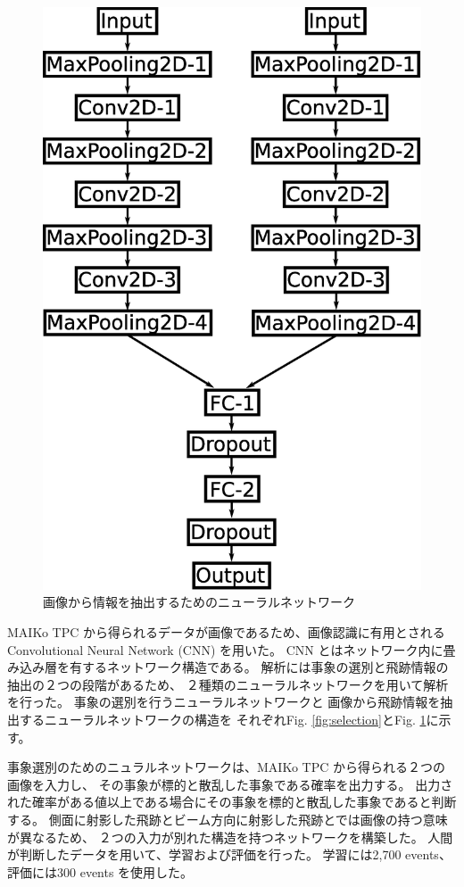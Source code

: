 \documentclass{jps-cp}
\begin{document}
\begin{figure}
\begin{minipage}{0.4\columnwidth}
    \includegraphics[clip, width=0.9\columnwidth]{eps/point_detection.eps}
    \caption{画像から情報を抽出するためのニューラルネットワーク}
    \label{fig:extraction}
  \end{minipage}
\end{figure}

MAIKo TPC から得られるデータが画像であるため、画像認識に有用とされるConvolutional Neural Network (CNN) を用いた。
CNN とはネットワーク内に畳み込み層を有するネットワーク構造である。
解析には事象の選別と飛跡情報の抽出の２つの段階があるため、
２種類のニューラルネットワークを用いて解析を行った。
事象の選別を行うニューラルネットワークと
画像から飛跡情報を抽出するニューラルネットワークの構造を
それぞれFig. \ref{fig:selection}とFig. \ref{fig:extraction}に示す。

事象選別のためのニュラルネットワークは、MAIKo TPC から得られる２つの画像を入力し、
その事象が標的と散乱した事象である確率を出力する。
出力された確率がある値以上である場合にその事象を標的と散乱した事象であると判断する。
側面に射影した飛跡とビーム方向に射影した飛跡とでは画像の持つ意味が異なるため、
２つの入力が別れた構造を持つネットワークを構築した。
人間が判断したデータを用いて、学習および評価を行った。
学習には2,700 events、評価には300 events を使用した。
\end{document}
